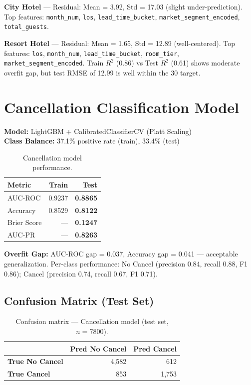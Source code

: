 \documentclass[12pt,a4paper,openany]{report}
\begin{document}
\textbf{City Hotel} --- Residual: Mean = 3.92, Std = 17.03 (slight under-prediction). Top features: \texttt{month\_num}, \texttt{los}, \texttt{lead\_time\_bucket}, \texttt{market\_segment\_encoded}, \texttt{total\_guests}.

\textbf{Resort Hotel} --- Residual: Mean = 1.65, Std = 12.89 (well-centered). Top features: \texttt{los}, \texttt{month\_num}, \texttt{lead\_time\_bucket}, \texttt{room\_tier}, \texttt{market\_segment\_encoded}. Train $R^2$ (0.86) vs Test $R^2$ (0.61) shows moderate overfit gap, but test RMSE of \texteuro{}12.99 is well within the \texteuro{}30 target.

\section{Cancellation Classification Model}

\textbf{Model:} LightGBM + CalibratedClassifierCV (Platt Scaling)\\
\textbf{Class Balance:} 37.1\% positive rate (train), 33.4\% (test)

\begin{table}[H]
\centering
\caption{Cancellation model performance.}
\label{tab:cancelperf}
\begin{tabular}{@{}lrr@{}}
\toprule
\textbf{Metric} & \textbf{Train} & \textbf{Test} \\
\midrule
AUC-ROC    & 0.9237 & \textbf{0.8865} \\
Accuracy   & 0.8529 & \textbf{0.8122} \\
Brier Score& ---    & \textbf{0.1247} \\
AUC-PR     & ---    & \textbf{0.8263} \\
\bottomrule
\end{tabular}
\end{table}

\textbf{Overfit Gap:} AUC-ROC gap = 0.037, Accuracy gap = 0.041 --- acceptable generalization. Per-class performance: No Cancel (precision 0.84, recall 0.88, F1 0.86); Cancel (precision 0.74, recall 0.67, F1 0.71).

\subsection{Confusion Matrix (Test Set)}

\begin{table}[H]
\centering
\caption{Confusion matrix --- Cancellation model (test set, $n=7800$).}
\label{tab:cancelcm}
\begin{tabular}{@{}lrr@{}}
\toprule
 & \textbf{Pred No Cancel} & \textbf{Pred Cancel} \\
\midrule
\textbf{True No Cancel} & 4,582 & 612 \\
\textbf{True Cancel}    & 853   & 1,753 \\
\bottomrule
\end{tabular}
\end{table}
\end{document}
